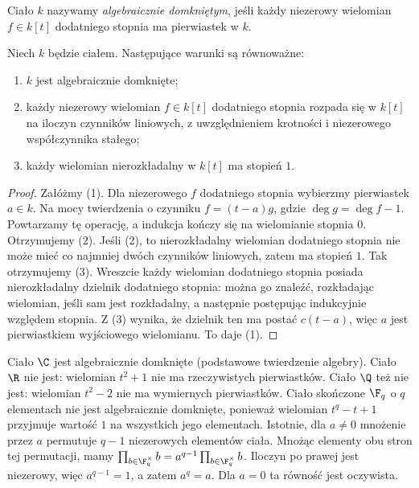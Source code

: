 \begin{definicja}
Ciało $k$ nazywamy \emph{algebraicznie domkniętym}, jeśli każdy
niezerowy wielomian $f\in k[t]$ dodatniego stopnia ma pierwiastek w $k$.
\end{definicja}

\begin{stwierdzenie}
Niech $k$ będzie ciałem. Następujące warunki są równoważne:
\begin{enumerate}[label=\arabic*)]
\item $k$ jest algebraicznie domknięte;
\item każdy niezerowy wielomian $f\in k[t]$ dodatniego stopnia
rozpada się w $k[t]$ na iloczyn czynników liniowych, z uwzględnieniem
krotności i niezerowego współczynnika stałego;
\item każdy wielomian nierozkładalny w $k[t]$ ma stopień $1$.
\end{enumerate}
\end{stwierdzenie}
\begin{proof}
Załóżmy (1). Dla niezerowego $f$ dodatniego stopnia wybierzmy
pierwiastek $a\in k$. Na mocy twierdzenia o czynniku
$f=(t-a)g$, gdzie $\deg g=\deg f-1$. Powtarzamy tę operację,
a indukcja kończy się na wielomianie stopnia $0$. Otrzymujemy (2).
Jeśli (2), to nierozkładalny wielomian dodatniego stopnia nie może
mieć co najmniej dwóch czynników liniowych, zatem ma stopień $1$.
Tak otrzymujemy (3). Wreszcie każdy wielomian dodatniego stopnia
posiada nierozkładalny dzielnik dodatniego stopnia:
można go znaleźć, rozkładając wielomian, jeśli sam jest rozkładalny,
a następnie postępując indukcyjnie względem stopnia.
Z (3) wynika, że dzielnik ten ma postać $c(t-a)$,
więc $a$ jest pierwiastkiem wyjściowego wielomianu. To daje (1).
\end{proof}

\begin{przyklad}
Ciało $\C$ jest algebraicznie domknięte (podstawowe twierdzenie algebry).
Ciało $\R$ nie jest: wielomian $t^2+1$ nie ma rzeczywistych pierwiastków.
Ciało $\Q$ też nie jest: wielomian $t^2-2$ nie ma wymiernych
pierwiastków. Ciało skończone $\F_q$ o $q$ elementach nie jest algebraicznie
domknięte, ponieważ wielomian $t^q-t+1$ przyjmuje wartość $1$
na wszystkich jego elementach. Istotnie, dla $a\ne0$
mnożenie przez $a$ permutuje $q-1$ niezerowych elementów ciała.
Mnożąc elementy obu stron tej permutacji, mamy
$\prod_{b\in\F_q^\times}b
=a^{q-1}\prod_{b\in\F_q^\times}b$.
Iloczyn po prawej jest niezerowy, więc $a^{q-1}=1$,
a zatem $a^q=a$. Dla $a=0$ ta równość jest oczywista.
\end{przyklad}

